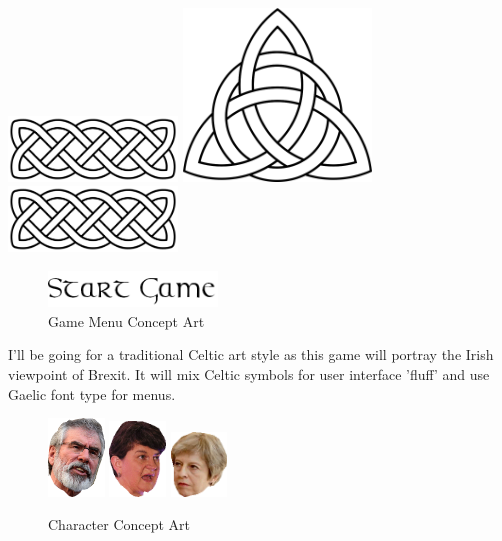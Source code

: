 \documentclass[a4paper]{scrreprt}
\begin{document}
\begin{center}
\includegraphics[width=4.5cm]{celtic-knot}
\includegraphics[width=5cm]{celtic-knot-arrow}
\includegraphics[width=4.5cm]{celtic-knot}
\begin{figure}[H]
\centering
\includegraphics[width=4.5cm]{start-game}
\caption{\label{fig:art} Game Menu Concept Art}
\end{figure}
\end{center}

I'll be going for a traditional Celtic art style as this game will portray the Irish viewpoint of Brexit. 
It will mix Celtic symbols for user interface 'fluff' and use Gaelic font type for menus.

\begin{figure}[H]
\begin{addmargin}[13.5em]{0em}
\includegraphics[width=1.5cm]{gerry-right}
\includegraphics[width=1.5cm]{arlene}
\includegraphics[width=1.5cm]{tess}
\end{addmargin}
\caption{\label{fig:art} Character Concept Art}
\end{figure}
\end{document}
